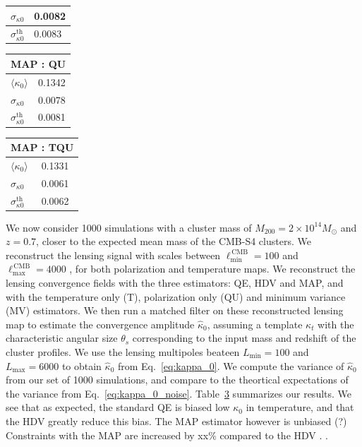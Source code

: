 \documentclass[prd, superscriptaddress, tightenlines, longbibliography, nofootinbib, eqsecnum, amsfonts, amsmath, floatfix, twocolumn, notitlepage]{revtex4-2}
\newcommand{\LL}[1]{{\color{orange}{LL: #1}}}
\begin{document}
\begin{table}
\begin{tabularx}{0.15\textwidth}{|X|X|}
    $\sigma_{\kappa 0}$ & 0.0082  \\\hline
    $\sigma_{\kappa 0}^{\text{th}}$ & 0.0083  \\\hline
    \end{tabularx}
    \begin{tabularx}{0.15\textwidth}{|X|X|}
    \hline
    \multicolumn{2}{|c|}{MAP : QU} \\ \hline
    $\langle\kappa_0 \rangle$      & 0.1342   \\ \hline
    $\sigma_{\kappa 0}$ & 0.0078  \\\hline
    $\sigma_{\kappa 0}^{\text{th}}$ & 0.0081  \\\hline
    \end{tabularx}
    \begin{tabularx}{0.15\textwidth}{|X|X|}
    \hline
    \multicolumn{2}{|c|}{MAP : TQU} \\ \hline
    $\langle\kappa_0 \rangle$      & 0.1331   \\ \hline
    $\sigma_{\kappa 0}$ & 0.0061  \\\hline
    $\sigma_{\kappa 0}^{\text{th}}$ & 0.0062  \\\hline
    \end{tabularx}
    \label{tab:results}
\end{table}

We now consider 1000 simulations with a cluster mass of $M_{200} = 2 \times 10^{14} M_{\odot}$ and $z=0.7$, closer to the expected mean mass of the CMB-S4 clusters. We reconstruct the lensing signal with scales between  $\ell_{\text{min}}^{\, \text{CMB}}=100$ and $\ell_{\text{max}}^{\, \text{CMB}} = 4000$ \LL{to check}, for both polarization and temperature maps.
We reconstruct the lensing convergence fields with the three estimators: QE, HDV and MAP, and with the temperature only (T), polarization only (QU) and minimum variance (MV) estimators. We then run a matched filter on these reconstructed lensing map to estimate the convergence amplitude $\hat \kappa_0$, assuming a template $\kappa_t$ with the characteristic angular size $\theta_s$ corresponding to the input mass and redshift of the cluster profiles. 
We use the lensing multipoles beateen $L_{\text{min}}=100$ and $L_{\text{max}}=6000$ to obtain $\hat \kappa_0$ from Eq.~\ref{eq:kappa_0}. We compute the variance of $\hat \kappa_0$ from our set of 1000 simulations, and compare to the theortical expectations of the variance from Eq.~\ref{eq:kappa_0_noise}.
Table~\ref{tab:results} summarizes our results. 
We see that as expected, the standard QE is biased low $\kappa_0$ in temperature, and that the HDV greatly reduce this bias. 
The MAP estimator however is unbiased (?)
Constraints with the MAP are increased by xx\% compared to the HDV
\LL{to develop given the last version of the Table}. \LL{Give bias in terms of number of sigma}. 
\end{document}
